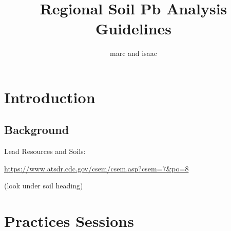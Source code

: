 \documentclass{article}\usepackage[]{graphicx}\usepackage[]{color}
\title{Regional Soil Pb Analysis Guidelines}
\author{marc and isaac}
\begin{document}
\maketitle

\section{Introduction}

\subsection{Background}

Lead Resources and Soils:

\url{https://www.atsdr.cdc.gov/csem/csem.asp?csem=7&po=8}

(look under soil heading) 

\section{Practices Sessions}
\end{document}
